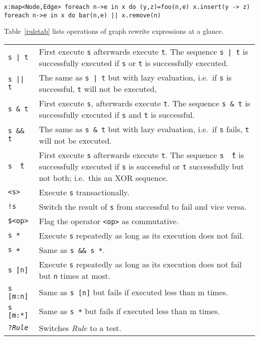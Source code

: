 \verb#x:map<Node,Edge> foreach n->e in x do (y,z)=foo(n,e) x.insert(y -> z) foreach n->e in x do bar(n,e) || x.remove(n)#

Table~\ref{ruletab} lists operations of graph rewrite expressions at a glance.

\makeatletter
\begin{table}[htbp]
\begin{minipage}{\linewidth} \renewcommand{\footnoterule}{} 
\begin{tabularx}{\linewidth}{|lX|}
\hline
\texttt{s | t}		& First execute \texttt{s} afterwards execute \texttt{t}. The sequence \texttt{s | t} is successfully executed if \texttt{s} or \texttt{t} is successfully executed.\\
\texttt{s || t}	& The same as \texttt{s | t} but with lazy evaluation, i.e.\ if \texttt{s} is successful, \texttt{t} will not be executed,\\
\texttt{s \& t}	& First execute \texttt{s}, afterwards execute \texttt{t}. The sequence \texttt{s \& t} is successfully executed if \texttt{s} and \texttt{t} is successful.\\
\texttt{s \&\& t}	& The same as \texttt{s \& t} but with lazy evaluation, i.e.\ if \texttt{s} fails, \texttt{t} will not be executed.\\
\texttt{s \^\ t}	& First execute \texttt{s} afterwards execute \texttt{t}. The sequence \texttt{s \^\ t} is successfully executed if \texttt{s} is successful or \texttt{t} successfully but not both; i.e.\ this an XOR sequence.\\
\texttt{<s>}	& Execute \texttt{s} transactionally.\\
\texttt{!s}		& Switch the result of \texttt{s} from successful to fail and vice versa.\\
\texttt{\$<op>}	& Flag the operator \texttt{<op>} as commutative. \\
\texttt{s *}		& Execute \texttt{s} repeatedly as long as its execution does not fail.\\
\texttt{s +}		& Same as \texttt{s \&\& s *}.\\
\texttt{s [n]}	& Execute \texttt{s} repeatedly as long as its execution does not fail but \texttt{n} times at most.\\
\texttt{s [m:n]}	& Same as \texttt{s [n]} but fails if executed less than m times.\\
\texttt{s [m:*]}	& Same as \texttt{s *} but fails if executed less than m times.\\
\texttt{?\emph{Rule}} & Switches \emph{Rule} to a test. \\

\end{tabularx}
\end{minipage}
\end{table}
